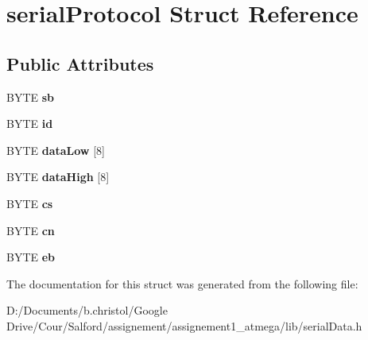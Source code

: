 \hypertarget{structserial_protocol}{}\section{serial\+Protocol Struct Reference}
\label{structserial_protocol}
\subsection*{Public Attributes}
\begin{DoxyCompactItemize}
\item 
\hypertarget{structserial_protocol_af8bbcf22377b98dadf690666f9d48156}{}B\+Y\+T\+E {\bfseries sb}\label{structserial_protocol_af8bbcf22377b98dadf690666f9d48156}

\item 
\hypertarget{structserial_protocol_a76964847a69881951e9da1317cc17571}{}B\+Y\+T\+E {\bfseries id}\label{structserial_protocol_a76964847a69881951e9da1317cc17571}

\item 
\hypertarget{structserial_protocol_a3e40b60e8c92091fb59e00ee05a07eb1}{}B\+Y\+T\+E {\bfseries data\+Low} \mbox{[}8\mbox{]}\label{structserial_protocol_a3e40b60e8c92091fb59e00ee05a07eb1}

\item 
\hypertarget{structserial_protocol_a4f9b454d8730babf5397c1f1d582e727}{}B\+Y\+T\+E {\bfseries data\+High} \mbox{[}8\mbox{]}\label{structserial_protocol_a4f9b454d8730babf5397c1f1d582e727}

\item 
\hypertarget{structserial_protocol_aeafe645e9ba8983649aac07b5c85f1a2}{}B\+Y\+T\+E {\bfseries cs}\label{structserial_protocol_aeafe645e9ba8983649aac07b5c85f1a2}

\item 
\hypertarget{structserial_protocol_a75f22d859a2edf76df2fc96f8dd4b901}{}B\+Y\+T\+E {\bfseries cn}\label{structserial_protocol_a75f22d859a2edf76df2fc96f8dd4b901}

\item 
\hypertarget{structserial_protocol_af8e01f5811bdc9a2906aceed9ae19f0f}{}B\+Y\+T\+E {\bfseries eb}\label{structserial_protocol_af8e01f5811bdc9a2906aceed9ae19f0f}

\end{DoxyCompactItemize}


The documentation for this struct was generated from the following file\+:\begin{DoxyCompactItemize}
\item 
D\+:/\+Documents/b.\+christol/\+Google Drive/\+Cour/\+Salford/assignement/assignement1\+\_\+atmega/lib/serial\+Data.\+h\end{DoxyCompactItemize}
